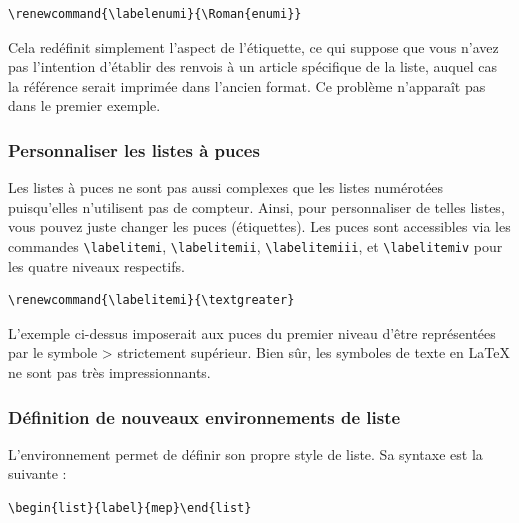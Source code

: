 \documentclass[a4paper,twoside]{article}
\begin{document}
\begin{verbatim}
\renewcommand{\labelenumi}{\Roman{enumi}}
\end{verbatim}

Cela redéfinit simplement l'aspect de l'étiquette, ce qui suppose que vous n'avez pas l'intention d'établir des renvois à un article spécifique de la liste, auquel cas la référence serait imprimée dans l'ancien format. Ce problème n'apparaît pas dans le premier exemple.

\subsubsection{Personnaliser les listes à puces}

Les listes à puces ne sont pas aussi complexes que les listes numérotées puisqu'elles n'utilisent pas de compteur. Ainsi, pour personnaliser de telles listes, vous pouvez juste changer les puces (étiquettes). Les puces sont accessibles via les commandes \verb|\labelitemi|, \verb|\labelitemii|, \verb|\labelitemiii|, et \verb|\labelitemiv| pour les quatre niveaux respectifs.

\begin{verbatim}
\renewcommand{\labelitemi}{\textgreater}
\end{verbatim}



L'exemple ci-dessus imposerait aux puces du premier niveau d'être représentées par le symbole \og > \fg strictement supérieur. Bien sûr, les symboles de texte en \LaTeX{} ne sont pas très impressionnants.

\subsubsection{Définition de nouveaux environnements de liste}
L'environnement  permet de définir son propre style de
liste. Sa syntaxe est la suivante :
\begin{verbatim}
\begin{list}{label}{mep}\end{list}
\end{verbatim}
\end{document}
